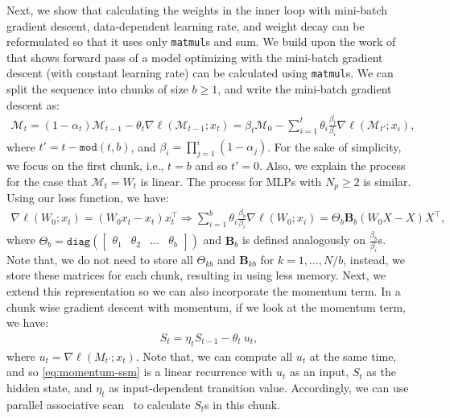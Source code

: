 \documentclass{article}
\newcommand{\citep}{\parencite}
\newcommand{\citet}{\textcite}
\newcommand{\M}[0]{\mathcal{M}}
\begin{document}
Next, we show that calculating the weights in the inner loop with mini-batch gradient descent, data-dependent learning rate, and weight decay can be reformulated so that it uses only \texttt{matmul}s and sum. We build upon the work of \citet{sun2024learning} that shows forward pass of a model optimizing with the mini-batch gradient descent (with constant learning rate) can be calculated using \texttt{matmul}s. We can split the sequence into chunks of size $b \geq 1$, and write the mini-batch gradient descent as:
\begin{align}
    \M_{t} = (1 - \alpha_t) \M_{t-1} - \theta_t \nabla \ell(\M_{t-1}; x_t) = \beta_{t} \M_0 - \sum_{i = 1}^{t} \theta_i \frac{\beta_{t}}{\beta_{i}} \nabla \ell(\M_{t'}; x_i),
\end{align}
where $t' = t - \texttt{mod}(t, b)$, and $\beta_{i} = \prod_{j=1}^{i}(1-\alpha_j)$. For the sake of simplicity, we focus on the first chunk, i.e., $t = b$ and so $t' = 0$. Also, we explain the process for the case that $\M_{t} = W_t$ is linear. The process for MLPs with $N_p \geq 2$ is similar. Using our loss function, we have:
\begin{align}\label{eq:weight-decay-matmul}
    \nabla \ell(W_{0}; x_t) =  (W_0 x_t - x_t) x_t^{\top} \Rightarrow \sum_{i = 1}^{b} \theta_i \frac{\beta_{b}}{\beta_{i}} \nabla \ell(W_{0}; x_i) = \Theta_b \mathbf{B}_b (W_0 X - X) X^{\top}, 
\end{align}
where $\Theta_b = \texttt{diag}\left(\begin{bmatrix}
    \theta_1 & \theta_2 & \dots & \theta_b
\end{bmatrix} \right)$ and $\mathbf{B}_b$ is defined analogously on $\frac{\beta_{b}}{\beta_{i}}$s. Note that, we do not need to store all $\Theta_{kb}$ and $\mathbf{B}_{kb}$ for $k = 1, \dots, N/b$, instead, we store these matrices for each chunk, resulting in using less memory. Next, we extend this representation so we can also incorporate the momentum term. In a chunk wise gradient descent with momentum, if we look at the momentum term, we have:
\begin{align}\label{eq:momentum-ssm}
    S_{t} = \eta_t {S_{t-1}} - \theta_t\:  u_t,
\end{align}
where $u_t = \nabla \ell\left(M_{t'}; x_{t} \right)$. Note that, we can compute all $u_t$ at the same time, and so \autoref{eq:momentum-ssm} is a linear recurrence with $u_t$ as an input, $S_t$ as the hidden state, and $\eta_t$ as input-dependent transition value. Accordingly, we can use parallel associative scan~\citep{smith2023simplified} to calculate $S_t$s in this chunk.  
\end{document}
